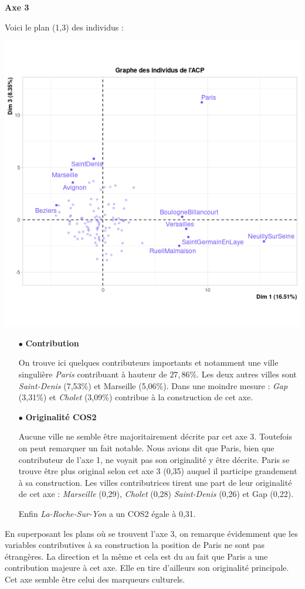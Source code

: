 \documentclass{article}
\begin{document}
\bigskip

{\large \textbf{Axe 3}}

Voici le plan (1,3) des individus : 

\centerline{\includegraphics[width=0.5\linewidth]{images/ACP_ind_13_contrib}} 

\begin{itemize}
\item[$\bullet$] \textbf{Contribution}

On trouve ici quelques contributeurs importants et notamment une ville singulière \emph{Paris} contribuant à hauteur de $27,86\%$. Les deux autres villes sont \emph{Saint-Denis} (7,53\%) et Marseille (5,06\%). Dans une moindre mesure : \emph{Gap} (3,31\%) et \emph{Cholet} (3,09\%) contribue à la construction de cet axe.

\item[$\bullet$] \textbf{Originalité COS2}

Aucune ville ne semble être majoritairement décrite par cet axe 3. Toutefois on peut remarquer un fait notable. Nous avions dit que Paris, bien que contributeur de l'axe 1, ne voyait pas son originalité y être décrite. Paris se trouve être plus original selon cet axe 3 (0,35) auquel il participe grandement à sa construction. Les villes contributrices tirent une part de leur originalité de cet axe : \emph{Marseille} (0,29),  \emph{Cholet} (0,28) \emph{Saint-Denis} (0,26) et Gap (0,22).

Enfin \emph{La-Roche-Sur-Yon} a un COS2 égale à 0,31.
\end{itemize}

En superposant les plans où se trouvent l'axe 3, on remarque évidemment que les variables contributives à sa construction la position de Paris ne sont pas étrangères. La direction et la même et cela est du au fait que Paris a une contribution majeure à cet axe. Elle en tire d'ailleurs son originalité principale. Cet axe semble être celui des marqueurs culturels. 
\end{document}
